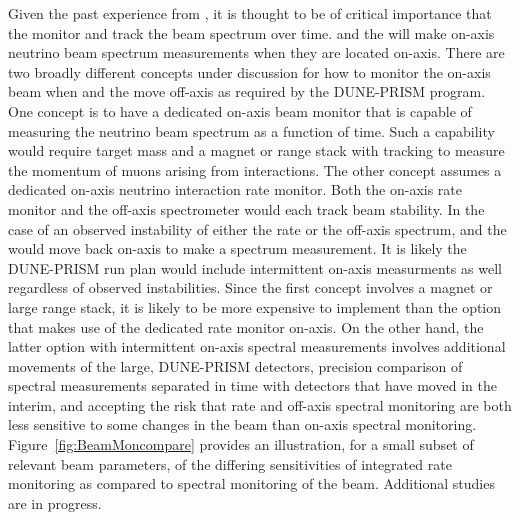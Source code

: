 Given the past experience from , it is thought to be of critical importance that the   monitor and track the beam spectrum over time.     and the  will make on-axis neutrino beam spectrum measurements when they are located on-axis.  There are two broadly different concepts under discussion for how to monitor the on-axis beam when  and the  move off-axis as required by the DUNE-PRISM program.  One concept is to have a dedicated on-axis beam monitor that is capable of measuring the neutrino beam spectrum as a function of time.  Such a capability would require target mass and a magnet or range stack with tracking to measure the momentum of muons arising from  \numu interactions.  The other concept assumes a dedicated on-axis neutrino interaction rate monitor.  Both the on-axis rate monitor and the off-axis spectrometer would each track beam stability. In the case of an observed instability of either the rate or the off-axis spectrum,  and the  would move back on-axis to make a spectrum measurement. It is likely the DUNE-PRISM run plan would include intermittent on-axis measurments as well regardless of observed instabilities.  Since the first concept involves a magnet or large range stack, it is likely to be more expensive to implement than the option that makes use of the dedicated rate monitor on-axis.  On the other hand, the latter option with intermittent on-axis spectral measurements involves additional movements of the large, DUNE-PRISM detectors, precision comparison of spectral measurements separated in time with detectors that have moved in the interim, and accepting the risk that rate and off-axis spectral monitoring are both less sensitive to some changes in the beam than on-axis spectral monitoring.  Figure~\ref{fig:BeamMoncompare} provides an illustration, for a small subset of relevant beam parameters, of the differing sensitivities of integrated rate monitoring as compared to spectral monitoring of the beam.  Additional studies are in progress.


